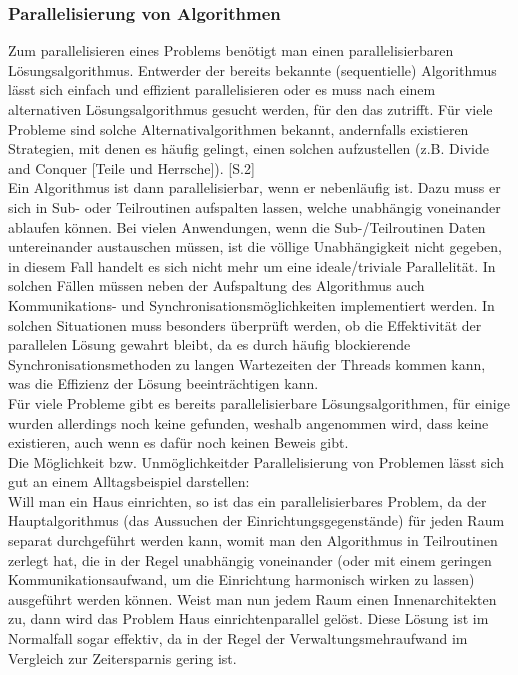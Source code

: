 \subsubsection{Parallelisierung von Algorithmen}
Zum parallelisieren eines Problems benötigt man einen parallelisierbaren Lösungsalgorithmus. Entwerder der bereits bekannte (sequentielle) Algorithmus lässt sich einfach und effizient parallelisieren oder es muss nach einem alternativen Lösungsalgorithmus gesucht werden, für den das zutrifft. Für viele Probleme sind solche Alternativalgorithmen bekannt, andernfalls existieren Strategien, mit denen es häufig gelingt, einen solchen aufzustellen (z.B. Divide and Conquer [Teile und Herrsche]). \cite{Schmidt_Schauss_Parallele_Verarbeitung}[S.2]\\
Ein Algorithmus ist dann parallelisierbar, wenn er nebenläufig ist. Dazu muss er sich in Sub- oder Teilroutinen aufspalten lassen, welche unabhängig voneinander ablaufen können. Bei vielen Anwendungen, wenn die Sub-/Teilroutinen Daten untereinander austauschen müssen, ist die völlige Unabhängigkeit nicht gegeben, in diesem Fall handelt es sich nicht mehr um eine ideale/triviale Parallelität. In solchen Fällen müssen neben der Aufspaltung des Algorithmus auch Kommunikations- und Synchronisationsmöglichkeiten implementiert werden. In solchen Situationen muss besonders überprüft werden, ob die Effektivität der parallelen Lösung gewahrt bleibt, da es durch häufig blockierende Synchronisationsmethoden zu langen Wartezeiten der Threads kommen kann, was die Effizienz der Lösung beeinträchtigen kann.\\
Für viele Probleme gibt es bereits parallelisierbare Lösungsalgorithmen, für einige wurden allerdings noch keine gefunden, weshalb angenommen wird, dass keine existieren, auch wenn es dafür noch keinen Beweis gibt.\\
Die Möglichkeit bzw. \glqq Unmöglichkeit\grqq  der Parallelisierung von Problemen lässt sich  gut an einem Alltagsbeispiel darstellen:\\
Will man ein Haus einrichten, so ist das ein parallelisierbares Problem, da der Hauptalgorithmus (das Aussuchen der Einrichtungsgegenstände) für jeden Raum separat durchgeführt werden kann, womit man den Algorithmus in Teilroutinen zerlegt hat, die in der Regel unabhängig voneinander (oder mit einem geringen Kommunikationsaufwand, um die Einrichtung harmonisch wirken zu lassen) ausgeführt werden können. Weist man nun jedem Raum einen Innenarchitekten zu, dann wird das Problem \glqq Haus einrichten\grqq  parallel gelöst. Diese Lösung ist im Normalfall sogar effektiv, da in der Regel der Verwaltungsmehraufwand im Vergleich zur Zeitersparnis gering ist.\\
